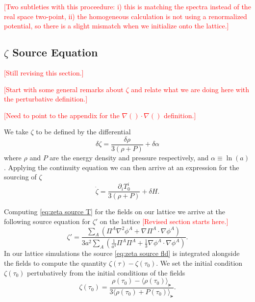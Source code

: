 \textcolor{red}{[Two subtleties with this proceedure: i) this is matching the spectra instead of the real space two-point, ii) the homogeneous calculation is not using a renormalized potential, so there is a slight mismatch when we initialize onto the lattice.]}

\subsection{$\zeta$ Source Equation} \label{sec:zeta source}
\textcolor{red}{[Still revising this section.]}

\textcolor{red}{[Start with some general remarks about $\zeta$ and relate what we are doing here with the perturbative definition.]}

\textcolor{red}{[Need to point to the appendix for the $\nabla()\cdot\nabla()$ definition.]}

We take $\zeta$ to be defined by the differential
\begin{equation} \label{eq:zeta differential}
  \delta\zeta = \frac{\delta\rho}{3(\rho + P)} + \delta\alpha
\end{equation} 
where $\rho$ and $P$ are the energy density and pressure respectively, and $\alpha \equiv \ln(a)$.
Applying the continuity equation we can then arrive at an expression for the sourcing of $\zeta$
\begin{equation} \label{eq:zeta source T}
  \dot{\zeta} = \frac{\partial_iT^i_0}{3(\rho+P)} + \delta H. %
\end{equation}

Computing \eqref{eq:zeta source T} for the fields on our lattice we arrive at the following source equation for $\zeta'$ on the lattice
%
\textcolor{red}{[Revised section starts here.]}
\begin{equation} \label{eq:zeta source fld}
  \zeta' = \frac{\sum_A\left(\Pi^A\nabla^2\phi^A + \nabla\Pi^A\cdot\nabla\phi^A\right)}{3a^2\sum_A\left(\frac{1}{a^4}\Pi^A\Pi^A + \frac{1}{3}\nabla\phi^A\cdot\nabla\phi^A \right)}.
\end{equation}
In our lattice simulations the source \eqref{eq:zeta source fld} is integrated alongside the fields to compute the quantity $\zeta(\tau) - \zeta(\tau_0)$.
We set the initial condition $\zeta(\tau_0)$ pertubatively from the initial conditions of the fields
\begin{equation}
  \zeta(\tau_0) = \frac{\rho(\tau_0)-\langle\rho(\tau_0)\rangle_\lat}{3\langle\rho(\tau_0)+P(\tau_0)\rangle_\lat}.
\end{equation}

